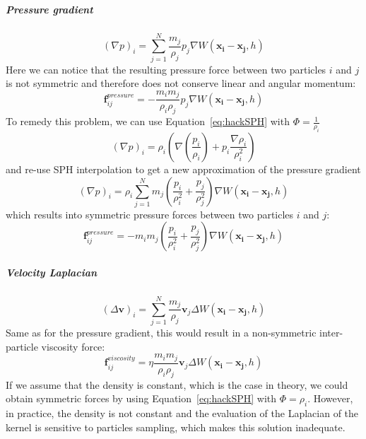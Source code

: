 \subparagraph{Pressure gradient}
\begin{equation}
\left(\nabla p\right)_{i} = \sum_{j=1}^{N} \frac{m_{j}}{\rho_{j}} p_{j} \nabla W(\mathbf{x_{i}}-\mathbf{x_{j}},h)
\end{equation}
Here we can notice that the resulting pressure force between two particles $i$ and $j$ is not symmetric and therefore does not conserve linear and angular momentum:
\begin{equation}
\label{eq:nonSymmetricPressureForce}
\mathbf{f}^{pressure}_{ij} = -\frac{m_{i}m_{j}}{\rho_{i}\rho_{j}}p_{j}\nabla W(\mathbf{x_{i}}-\mathbf{x_{j}},h)
\end{equation}
To remedy this problem, we can use Equation~\eqref{eq:hackSPH} with $\displaystyle \Phi = \frac{1}{\rho_{i}}$
\begin{equation}
\left(\nabla p\right)_{i} = \rho_{i} \left( \nabla \left(\frac{p_{i}}{\rho_{i}}\right) + p_{i}\frac{\nabla \rho_{i}}{\rho_{i}^{2}}\right)
\end{equation}
and re-use SPH interpolation to get a new approximation of the pressure gradient
\begin{equation}
\label{eq:pressureGradientSPH}
\left(\nabla p\right)_{i} = 
\rho_{i}
\sum_{j=1}^{N} m_{j} \left( \frac{p_{i}}{\rho_{i}^{2}} + \frac{p_{j}}{\rho_{j}^{2}} \right) \nabla W(\mathbf{x_{i}}-\mathbf{x_{j}},h)
\end{equation}
which results into symmetric pressure forces between two particles $i$ and $j$:
\begin{equation}
\label{eq:symmetricPressureForce}
\mathbf{f}^{pressure}_{ij} = 
-m_{i}m_{j}
\left( 
\frac{p_{i}}{\rho_{i}^{2}} + \frac{p_{j}}{\rho_{j}^{2}} 
\right) 
\nabla W(\mathbf{x_{i}}-\mathbf{x_{j}},h)
\end{equation}
\subparagraph{Velocity Laplacian}
\begin{equation}
\left(\Delta \mathbf{v}\right)_{i} = \sum_{j=1}^{N} \frac{m_{j}}{\rho_{j}} \mathbf{v}_{j} \Delta W(\mathbf{x_{i}}-\mathbf{x_{j}},h)
\end{equation}
Same as for the pressure gradient, this would result in a non-symmetric inter-particle viscosity force:
\begin{equation}
\label{eq:nonSymmetricViscosityForce}
\mathbf{f}^{viscosity}_{ij} = \eta\frac{m_{i}m_{j}}{\rho_{i}\rho_{j}}\mathbf{v}_{j}\Delta W(\mathbf{x_{i}}-\mathbf{x_{j}},h)
\end{equation}
If we assume that the density is constant, which is the case in theory, we could obtain symmetric forces by using Equation~\eqref{eq:hackSPH} with $\Phi=\rho_{i}$. However, in practice, the density is not constant and the evaluation of the Laplacian of the kernel is sensitive to particles sampling, which makes this solution inadequate.
